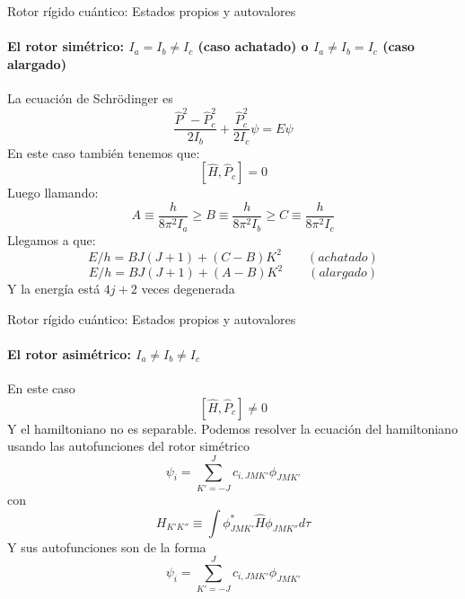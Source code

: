 \documentclass[a4paper]{beamer}
\begin{document}
\begin{frame}{Rotor rígido cuántico: Estados propios y autovalores}
\framesubtitle {El rotor simétrico: $I_a=I_b\neq I_c$ (caso achatado) o $I_a\neq I_b=I_c$ (caso alargado)}
La ecuación de Schrödinger es
\begin{equation*}
\frac{\hat P^2- \hat P_c^2}{2I_b}+\frac{\hat P_c^2}{2I_c}\psi=E\psi
\end{equation*}
En este caso también tenemos que:
\begin{equation}
\left[\hat H,\hat P_c \right]=0
\end{equation}
Luego llamando:
 \begin{equation}
 A \equiv \frac{h}{8\pi^2I_a}\geq B\equiv \frac{h}{8\pi^2I_b}\geq C\equiv \frac{h}{8\pi^2I_c}
 \end{equation}
 Llegamos a que:
 \begin{equation}
 E/h=BJ\left(J+1\right)+\left(C-B\right)K^2 \qquad (achatado)
 \end{equation}
 \begin{equation}
 E/h=BJ\left(J+1\right)+\left(A-B\right)K^2 \qquad (alargado)
 \end{equation}
 Y la energía está $4j+2$ veces degenerada
\end{frame}

\begin{frame}{Rotor rígido cuántico: Estados propios y autovalores}
\framesubtitle {El rotor asimétrico: $I_a \neq I_b\neq I_c$ }
En este caso
\begin{equation}
\left[\hat H,\hat P_c \right] \neq 0
\end{equation}
Y el hamiltoniano no es separable.
Podemos resolver la ecuación del hamiltoniano usando  las autofunciones del rotor simétrico
\begin{equation}
\psi_i = \sum_{K'=-J}^Jc_{i,JMK'}\phi_{JMK'}
\end{equation}
con
\begin{equation}
H_{K'K''}\equiv\int\phi^*_{JMK'}\hat H\phi_{JMK''}d\tau
\end{equation}
Y sus autofunciones son de la forma
\begin{equation}
\psi_i = \sum_{K'=-J}^Jc_{i,JMK'}\phi_{JMK'}
\end{equation}
\end{frame}
\end{document}
